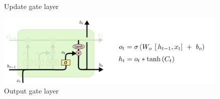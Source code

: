 \begin{frame}[allowframebreaks]
\begin{figure}[htp]
        \caption{Update gate layer}
    \end{figure}
    \begin{figure}[htp]
        \centering
        \includegraphics[width=\textwidth]{topics/201010-zhang2019comprehensive/assets/img/LSTM-4.png}
        \caption{Output gate layer}
    \end{figure}
\end{frame}